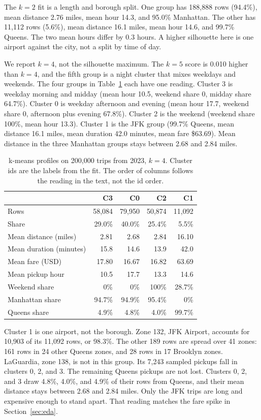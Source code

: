 The $k = 2$ fit is a length and borough split. One group has 188{,}888 rows (94.4\%), mean distance 2.76 miles, mean hour 14.3, and 95.0\% Manhattan. The other has 11{,}112 rows (5.6\%), mean distance 16.1 miles, mean hour 14.6, and 99.7\% Queens. The two mean hours differ by 0.3 hours. A higher silhouette here is one airport against the city, not a split by time of day.

We report $k = 4$, not the silhouette maximum. The $k = 5$ score is 0.010 higher than $k = 4$, and the fifth group is a night cluster that mixes weekdays and weekends. The four groups in Table~\ref{tab:clusters} each have one reading. Cluster 3 is weekday morning and midday (mean hour 10.5, weekend share 0, midday share 64.7\%). Cluster 0 is weekday afternoon and evening (mean hour 17.7, weekend share 0, afternoon plus evening 67.8\%). Cluster 2 is the weekend (weekend share 100\%, mean hour 13.3). Cluster 1 is the JFK group (99.7\% Queens, mean distance 16.1 miles, mean duration 42.0 minutes, mean fare \$63.69). Mean distance in the three Manhattan groups stays between 2.68 and 2.84 miles.

\begin{table}[ht]
\centering
\caption{k-means profiles on 200{,}000 trips from 2023, $k = 4$. Cluster ids are the labels from the fit. The order of columns follows the reading in the text, not the id order.}
\label{tab:clusters}
\small
\setlength{\tabcolsep}{5pt}
\begin{tabular}{lrrrr}
\toprule
 & C3 & C0 & C2 & C1 \\
\midrule
Rows & 58,084 & 79,950 & 50,874 & 11,092 \\
Share & 29.0\% & 40.0\% & 25.4\% & 5.5\% \\
Mean distance (miles) & 2.81 & 2.68 & 2.84 & 16.10 \\
Mean duration (minutes) & 15.8 & 14.6 & 13.9 & 42.0 \\
Mean fare (USD) & 17.80 & 16.67 & 16.82 & 63.69 \\
Mean pickup hour & 10.5 & 17.7 & 13.3 & 14.6 \\
Weekend share & 0\% & 0\% & 100\% & 28.7\% \\
Manhattan share & 94.7\% & 94.9\% & 95.4\% & 0\% \\
Queens share & 4.9\% & 4.8\% & 4.0\% & 99.7\% \\
\bottomrule
\end{tabular}
\end{table}

Cluster 1 is one airport, not the borough. Zone 132, JFK Airport, accounts for 10,903 of its 11,092 rows, or 98.3\%. The other 189 rows are spread over 41 zones: 161 rows in 24 other Queens zones, and 28 rows in 17 Brooklyn zones. LaGuardia, zone 138, is not in this group. Its 7,243 sampled pickups fall in clusters 0, 2, and 3. The remaining Queens pickups are not lost. Clusters 0, 2, and 3 draw 4.8\%, 4.0\%, and 4.9\% of their rows from Queens, and their mean distance stays between 2.68 and 2.84 miles. Only the JFK trips are long and expensive enough to stand apart. That reading matches the fare spike in Section~\ref{sec:eda}.

